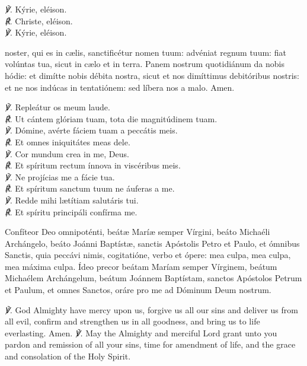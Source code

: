 {
\textit{\scshape ℣.} Kýrie, eléison.\\
\textit{\scshape ℟.} Christe, eléison.\\
\textit{\scshape ℣.} Kýrie, eléison.\\
\par\noindent
{} noster, qui es in c{\ae}lis, sanctificétur nomen tuum: advéniat regnum tuum: fiat volúntas tua, sicut in c{\ae}lo et in terra. Panem nostrum quotidiánum da nobis hódie: et dimítte nobis débita nostra, sicut et nos dimíttimus debitóribus nostris: et ne nos indúcas in tentatiónem: sed líbera nos a malo. Amen.\\
\par\noindent
\textit{\scshape ℣.} Repleátur os meum laude.\\
\textit{\scshape ℟.} Ut cántem glóriam tuam, tota die magnitúdinem tuam.\\
\textit{\scshape ℣.} Dómine, avérte fáciem tuam a peccátis meis.\\
\textit{\scshape ℟.} Et omnes iniquitátes meas dele.\\
\textit{\scshape ℣.} Cor mundum crea in me, Deus.\\
\textit{\scshape ℟.} Et spíritum rectum ínnova in viscéribus meis.\\
\textit{\scshape ℣.} Ne projícias me a fácie tua.\\
\textit{\scshape ℟.} Et spíritum sanctum tuum ne áuferas a me.\\
\textit{\scshape ℣.} Redde mihi lætítiam salutáris tui.\\
\textit{\scshape ℟.} Et spíritu principáli confírma me.\\
\par\noindent
Confíteor Deo omnipoténti, beátæ Maríæ semper Vírgini, beáto Michaéli Archángelo, beáto Joánni Baptístæ, sanctis Apóstolis Petro et Paulo, et ómnibus Sanctis, quia peccávi nimis, cogitatióne, verbo et ópere: mea culpa, mea culpa, mea máxima culpa. Ídeo precor beátam Maríam semper Vírginem, beátum Michaélem Archángelum, beátum Joánnem Baptístam, sanctos Apóstolos Petrum et Paulum, et omnes Sanctos, oráre pro me ad Dóminum Deum nostrum.
}
\textit{\scshape ℣.} God Almighty have mercy upon us, forgive us all our sins and deliver us from all evil, confirm and strengthen us in all goodness, and bring us to life everlasting. Amen.
\textit{\scshape ℣.} May the Almighty and merciful Lord grant unto you {} pardon and remission of all your sins, time for amendment of life, and the grace and consolation of the Holy Spirit.\\
